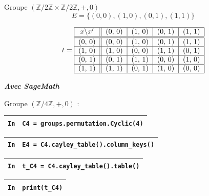 \documentclass[titlepage]{article}
\begin{document}
        Groupe $(\mathbb{Z}/2\mathbb{Z} \times \mathbb{Z}/2\mathbb{Z}, +, 0)$
        \[E = \{(0, 0), (1, 0), (0, 1), (1, 1)\}\]
  
        \[t=\begin{tabular}{| c || c | c | c | c |}
            \hline
            $x$\textbackslash $x'$ & (0, 0) & (1, 0) & (0, 1) & (1, 1) \\ \hline \hline
            (0, 0) & (0, 0) & (1, 0) & (0, 1) & (1, 1) \\ \hline
            (1, 0) & (1, 0) & (0, 0) & (1, 1) & (0, 1) \\ \hline
            (0, 1) & (0, 1) & (1, 1) & (0, 0) & (1, 0) \\ \hline
            (1, 1) & (1, 1) & (0, 1) & (1, 0) & (0, 0) \\
            \hline
        \end{tabular}\]

        \textbf{\emph{Avec SageMath}}
        \vspace*{2mm}

        Groupe $(\mathbb{Z}/4\mathbb{Z}, +, 0)$ :
        \vspace*{2mm}

        \begin{tabularx}{11.5cm}{|p{0.60cm}|X|}
            \hline
            \verb|In|
            & 
            \verb|C4 = groups.permutation.Cyclic(4)|
            \\
            \hline
        \end{tabularx}
        
        \begin{tabularx}{11.5cm}{|p{0.60cm}|X|}
            \hline
            \verb|In|
            & 
            \verb|E4 = C4.cayley_table().column_keys()|
            \\
            \hline
        \end{tabularx}

        \begin{tabularx}{11.5cm}{|p{0.60cm}|X|}
            \hline
            \verb|In|
            & 
            \verb|t_C4 = C4.cayley_table().table()|
            \\
            \hline
        \end{tabularx}
        
        \begin{tabularx}{11.5cm}{|p{0.60cm}|X|}
            \hline
            \verb|In|
            & 
            \verb|print(t_C4)|
            \\
            \hline
        \end{tabularx}
\end{document}
